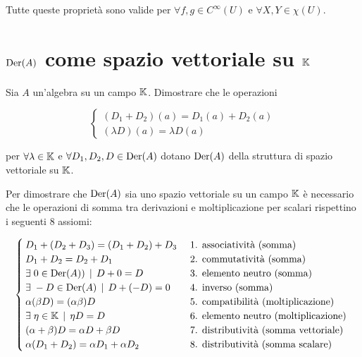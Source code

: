 Tutte queste proprietà sono valide per $ \forall f,g \in C^{\infty}(U) $ e $ \forall X,Y \in \chi(U) $.

%

\newpage

%

\section{$ \operatorname{Der}(A) $ come spazio vettoriale su $ \mathbb{K} $}\label{es1-10}

\begin{tcolorbox}
	Sia $ A $ un'algebra su un campo $ \mathbb{K} $. Dimostrare che le operazioni
	
	\begin{equation}
		\begin{cases}
			(D_{1}+D_{2})(a) = D_{1}(a) + D_{2}(a)\\
			(\lambda D)(a) = \lambda D(a)
		\end{cases}
	\end{equation}
	
	per $ \forall \lambda \in \mathbb{K} $ e $ \forall D_{1},D_{2},D \in \operatorname{Der}(A) $ dotano $ \operatorname{Der}(A) $ della struttura di spazio vettoriale su $ \mathbb{K} $.
\end{tcolorbox}

Per dimostrare che $ \operatorname{Der}(A) $ sia uno spazio vettoriale su un campo $ \mathbb{K} $ è necessario che le operazioni di somma tra derivazioni e moltiplicazione per scalari rispettino i seguenti 8 assiomi:

\begin{equation}
	\begin{cases}
		D_{1} + (D_{2} + D_{3}) = (D_{1} + D_{2}) + D_{3} & \text{ 1. associatività (somma) }\\
		D_{1} + D_{2} = D_{2} + D_{1} & \text{ 2. commutatività (somma) }\\
		\exists \; 0 \in \operatorname{Der}(A)) \, \mid \, D + 0 = D & \text{ 3. elemento neutro (somma) }\\
		\exists \; - D \in \operatorname{Der}(A) \, \mid \, D + (- D) = 0 & \text{ 4. inverso (somma) }\\
		\alpha (\beta D) = (\alpha \beta) D & \text{ 5. compatibilità (moltiplicazione) }\\
		\exists \; \eta \in \mathbb{K} \, \mid \, \eta D = D & \text{ 6. elemento neutro (moltiplicazione) }\\
		(\alpha + \beta) D = \alpha D + \beta D & \text{ 7. distributività (somma vettoriale) }\\
		\alpha (D_{1} + D_{2}) = \alpha D_{1} + \alpha D_{2} & \text{ 8. distributività (somma scalare) }
	\end{cases}
\end{equation}

